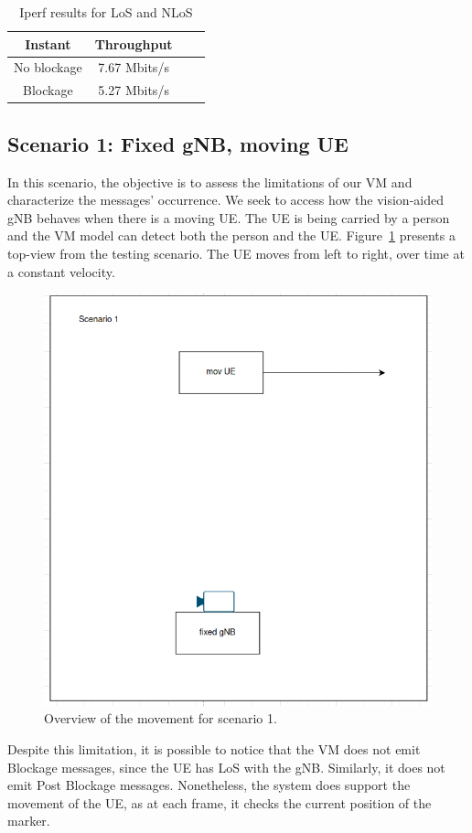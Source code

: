 \begin{table}[h]
    \centering %
    \begin{tabular}{|c|c|c|c|}
        \hline
        \textbf{Instant} & \textbf{Throughput} \\ \hline
        No blockage & 7.67 Mbits/s \\ \hline
        Blockage   &  5.27 Mbits/s \\ \hline
    \end{tabular}
    \caption{Iperf results for LoS and NLoS} %
    \label{tab:iperf} %
\end{table}


\subsection{Scenario 1: Fixed gNB, moving UE}\label{subsec:scenario-0.1:-fixed-gnb-moving-ue}

In this scenario, the objective is to assess the limitations of our VM and characterize the messages' occurrence\@.
We seek to access how the vision-aided gNB behaves when there is a moving UE\@.
The UE is being carried by a person and the VM model can detect both the person and the UE\@.
Figure~\ref{fig:test_movUE} presents a top-view from the testing scenario.
The UE moves from left to right, over time at a constant velocity.

\begin{figure}[H]
    \centering
    \includegraphics[width=0.5\linewidth]{figures/scenario1}
    \caption{Overview of the movement for scenario 1.}
    \label{fig:test_movUE}
\end{figure}

Despite this limitation, it is possible to notice that the VM does not emit Blockage messages, since the UE has LoS with the gNB\@.
Similarly, it does not emit Post Blockage messages.
Nonetheless, the system does support the movement of the UE, as at each frame, it checks the current position of the marker.

